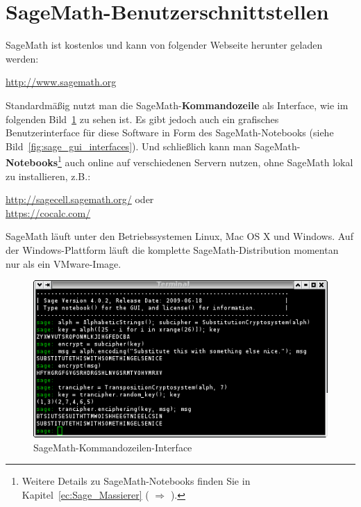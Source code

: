 \section*{SageMath-Benutzerschnittstellen}
SageMath ist kostenlos und kann von folgender Webseite herunter geladen werden:
\begin{center}
  \url{http://www.sagemath.org} \\
\end{center}
Standardmäßig nutzt man die SageMath-\textbf{Kommandozeile} als Interface, wie im
folgenden Bild~\ref{fig:sage_cmd_interfaces} zu sehen ist.
Es gibt jedoch auch ein grafisches Benutzerinterface für diese Software
in Form des SageMath-Notebooks (siehe Bild~\ref{fig:sage_gui_interfaces}).
Und schließlich kann man SageMath-\textbf{Notebooks}\footnote{%
Weitere Details zu SageMath-Notebooks finden Sie in
Kapitel~\ref{ec:Sage_Massierer}
(\glqq {}\grqq
  $\Rightarrow$ \glqq {}\grqq).
                      }
auch online auf verschiedenen Servern nutzen, ohne SageMath lokal zu installieren, z.B.:
\begin{center}
\url{http://sagecell.sagemath.org/} oder \\
\url{https://cocalc.com/}
\end{center}

SageMath läuft unter den Betriebssystemen Linux, Mac OS X und Windows.
Auf der Windows-Plattform läuft die komplette SageMath-Distribution momentan
nur als ein VMware-Image.

\begin{figure}[!htpb]
\centering
\includegraphics[scale=0.6]{figures/sage-cmd}
\caption{SageMath-Kommandozeilen-Interface}
\label{fig:sage_cmd_interfaces}
\end{figure}

